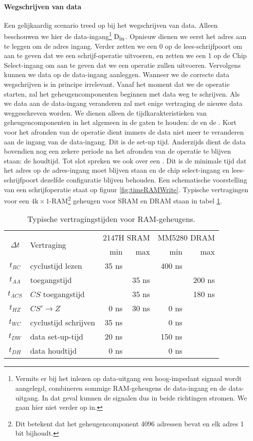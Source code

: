 \paragraph{Wegschrijven van data}
Een gelijkaardig scenario treed op bij het wegschrijven van data. Alleen beschouwen we hier de data-ingang\footnote{Vermits er bij het inlezen op data-uitgang een hoog-impedant signaal wordt aangelegd, combineren sommige RAM-geheugens de data-ingang en de data-uitgang. In dat geval kunnen de signalen dus in beide richtingen stromen. We gaan hier niet verder op in.} $\mbox{D}_{\mbox{\small{in}}}$. Opnieuw dienen we eerst het adres aan te leggen om de adres ingang. Verder zetten we een 0 op de lees-schrijfpoort om aan te geven dat we een schrijf-operatie uitvoeren, en zetten we een 1 op de Chip Select-ingang om aan te geven dat we een operatie zullen uitvoeren. Vervolgens kunnen we data op de data-ingang aanleggen. Wanneer we de correcte data wegschrijven is in principe irrelevant. Vanaf het moment dat we de operatie starten, zal het geheugencomponenten beginnen met data weg te schrijven. Als we data aan de data-ingang veranderen zal met enige vertraging de nieuwe data weggeschreven worden. We dienen alleen de
tijdkarakteristieken van geheugencomponenten in het algemeen in de gaten te houden: de  en de . Kort voor het afronden van de operatie dient immers de data niet meer te veranderen aan de ingang van de data-ingang. Dit is de set-up tijd. Anderzijds dient de data bovendien nog een zekere periode na het afronden van de operatie te blijven staan: de houdtijd. Tot slot spreken we ook over een . Dit is de minimale tijd dat het adres op de adres-ingang moet blijven staan en de chip select-ingang en lees-schrijfpoort dezelfde configuratie blijven behouden. Een schematische voorstelling van een schrijfoperatie staat op figuur \ref{fig:timeRAMWrite}. Typische vertragingen voor een $4\mbox{k}\times1$-RAM\footnote{Dit betekent dat het geheugencomponent 4096 adressen bevat en elk adres 1 bit bijhoudt.} geheugen voor SRAM en DRAM staan in tabel \ref{tbl:rAMDelaySamples}.
\begin{table}[hbt]
\centering
\begin{tabular}{cl|rr|rr}
\multirow{2}{*}{$\Delta t$}&\multirow{2}{*}{Vertraging}&\multicolumn{2}{c|}{2147H SRAM}&\multicolumn{2}{c}{MM5280 DRAM}\\
&&min&max&min&max\\
\hline
$t_{RC}$&cyclustijd lezen&35 ns&&400 ns&\\
$t_{AA}$&toegangstijd&&35 ns&&200 ns\\
$t_{ACS}$&$CS$ toegangstijd&&35 ns&&180 ns\\
$t_{HZ}$&$CS'\rightarrow Z$&0 ns&30 ns&0 ns&\\\hline
$t_{WC}$&cyclustijd schrijven&35 ns&&0 ns&\\
$t_{DW}$&data set-up-tijd&20 ns&&150 ns&\\
$t_{DH}$&data houdtijd&0 ns&&0 ns&\\
\end{tabular}
\caption{Typische vertragingstijden voor RAM-geheugens.}
\label{tbl:rAMDelaySamples}
\end{table}
